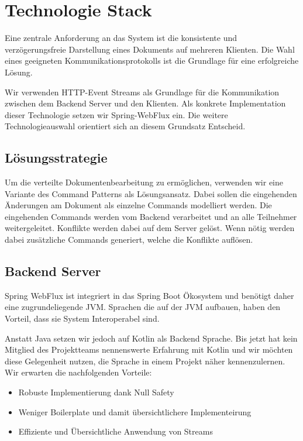 \section{Technologie Stack}

Eine zentrale Anforderung an das System ist die konsistente und verzögerungsfreie Darstellung eines Dokuments auf mehreren Klienten.
Die Wahl eines geeigneten Kommunikationsprotokolls ist die Grundlage für eine erfolgreiche Lösung.

Wir verwenden HTTP-Event Streams als Grundlage für die Kommunikation zwischen dem Backend Server und den Klienten.
Als konkrete Implementation dieser Technologie setzen wir Spring-WebFlux ein.
Die weitere Technologieauswahl orientiert sich an diesem Grundsatz Entscheid.

\subsection{Lösungsstrategie}
Um die verteilte Dokumentenbearbeitung zu ermöglichen, verwenden wir eine Variante des Command Patterns als Lösungsansatz.
Dabei sollen die eingehenden Änderungen am Dokument als einzelne Commands modelliert werden.
Die eingehenden Commands werden vom Backend verarbeitet und an alle Teilnehmer weitergeleitet.
Konflikte werden dabei auf dem Server gelöst.
Wenn nötig werden dabei zusätzliche Commands generiert, welche die Konflikte auflösen.


\subsection{Backend Server}
Spring WebFlux ist integriert in das Spring Boot Ökosystem und benötigt daher eine zugrundeliegende JVM\@.
Sprachen die auf der JVM aufbauen, haben den Vorteil, dass sie System Interoperabel sind.

Anstatt Java setzen wir jedoch auf Kotlin als Backend Sprache.
Bis jetzt hat kein Mitglied des Projektteams nennenswerte Erfahrung mit Kotlin und wir möchten diese Gelegenheit nutzen,
die Sprache in einem Projekt näher kennenzulernen.
Wir erwarten die nachfolgenden Vorteile: 

\begin{itemize}
    \item Robuste Implementierung dank Null Safety
    \item Weniger Boilerplate und damit übersichtlichere Implementeirung
    \item Effiziente und Übersichtliche Anwendung von Streams
\end{itemize}


